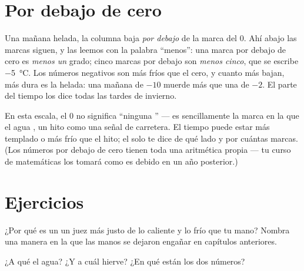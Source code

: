 \section{Por debajo de cero}

\begin{example}\label{ex:g3:temperature-thermometers:belowzero}
Una mañana helada, la columna baja \emph{por debajo} de la marca del
$0$. Ahí abajo las marcas siguen, y las leemos con la palabra
``menos'': una marca por debajo de cero es \emph{menos un} grado;
cinco marcas por debajo son \emph{menos cinco}, que se escribe
\qty{-5}{\celsius}. Los números negativos son más fríos que el cero, y
cuanto más bajan, más dura es la helada: una mañana de $-10$ muerde
más que una de $-2$. El parte del tiempo los dice todas las tardes de
invierno.
\end{example}

\begin{remark}\label{rem:g3:temperature-thermometers:zero}
En esta escala, el $0$ no significa ``ninguna '' --- es
sencillamente la marca en la que el agua , un hito como una
señal de carretera. El tiempo puede estar más templado o más frío que
el hito; el  solo te dice de qué lado y por cuántas
marcas. (Los números por debajo de cero tienen toda una aritmética
propia --- tu curso de matemáticas los tomará como es debido en un año
posterior.)
\end{remark}

\section{Ejercicios}

\begin{exercise}[$\star$]\label{exo:g3:temperature-thermometers:1}
¿Por qué es un  un juez más justo de lo caliente y lo frío
que tu mano? Nombra una manera en la que las manos se dejaron engañar
en capítulos anteriores.
\end{exercise}

\begin{exercise}[$\star$]\label{exo:g3:temperature-thermometers:2}
¿A qué   el agua? ¿Y a cuál hierve? ¿En qué
 están los dos números?
\end{exercise}

